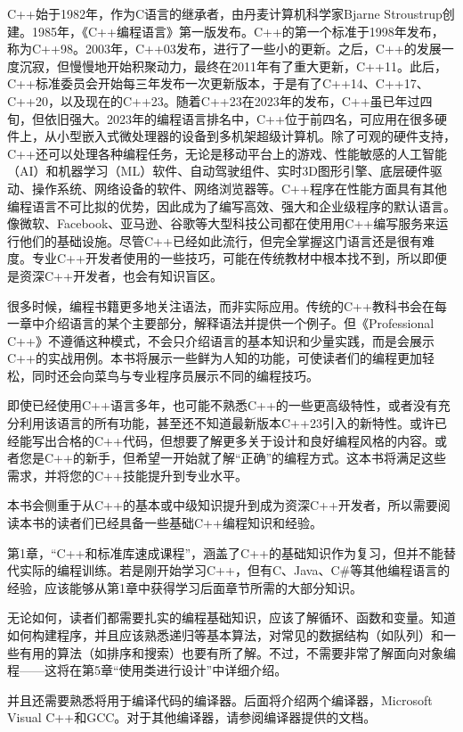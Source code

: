 
C++始于1982年，作为C语言的继承者，由丹麦计算机科学家Bjarne Stroustrup创建。1985年，《C++编程语言》第一版发布。C++的第一个标准于1998年发布，称为C++98。2003年，C++03发布，进行了一些小的更新。之后，C++的发展一度沉寂，但慢慢地开始积聚动力，最终在2011年有了重大更新，C++11。此后，C++标准委员会开始每三年发布一次更新版本，于是有了C++14、C++17、C++20，以及现在的C++23。随着C++23在2023年的发布，C++虽已年过四旬，但依旧强大。2023年的编程语言排名中，C++位于前四名，可应用在很多硬件上，从小型嵌入式微处理器的设备到多机架超级计算机。除了可观的硬件支持，C++还可以处理各种编程任务，无论是移动平台上的游戏、性能敏感的人工智能（AI）和机器学习（ML）软件、自动驾驶组件、实时3D图形引擎、底层硬件驱动、操作系统、网络设备的软件、网络浏览器等。C++程序在性能方面具有其他编程语言不可比拟的优势，因此成为了编写高效、强大和企业级程序的默认语言。像微软、Facebook、亚马逊、谷歌等大型科技公司都在使用用C++编写服务来运行他们的基础设施。尽管C++已经如此流行，但完全掌握这门语言还是很有难度。专业C++开发者使用的一些技巧，可能在传统教材中根本找不到，所以即便是资深C++开发者，也会有知识盲区。


很多时候，编程书籍更多地关注语法，而非实际应用。传统的C++教科书会在每一章中介绍语言的某个主要部分，解释语法并提供一个例子。但《Professional C++》不遵循这种模式，不会只介绍语言的基本知识和少量实践，而是会展示C++的实战用例。本书将展示一些鲜为人知的功能，可使读者们的编程更加轻松，同时还会向菜鸟与专业程序员展示不同的编程技巧。


即使已经使用C++语言多年，也可能不熟悉C++的一些更高级特性，或者没有充分利用该语言的所有功能，甚至还不知道最新版本C++23引入的新特性。或许已经能写出合格的C++代码，但想要了解更多关于设计和良好编程风格的内容。或者您是C++的新手，但希望一开始就了解“正确”的编程方式。这本书将满足这些需求，并将您的C++技能提升到专业水平。

本书会侧重于从C++的基本或中级知识提升到成为资深C++开发者，所以需要阅读本书的读者们已经具备一些基础C++编程知识和经验。

第1章，“C++和标准库速成课程”，涵盖了C++的基础知识作为复习，但并不能替代实际的编程训练。若是刚开始学习C++，但有C、Java、C\#等其他编程语言的经验，应该能够从第1章中获得学习后面章节所需的大部分知识。

无论如何，读者们都需要扎实的编程基础知识，应该了解循环、函数和变量。知道如何构建程序，并且应该熟悉递归等基本算法，对常见的数据结构（如队列）和一些有用的算法（如排序和搜索）也要有所了解。不过，不需要非常了解面向对象编程——这将在第5章“使用类进行设计”中详细介绍。

并且还需要熟悉将用于编译代码的编译器。后面将介绍两个编译器，Microsoft Visual C++和GCC。对于其他编译器，请参阅编译器提供的文档。

